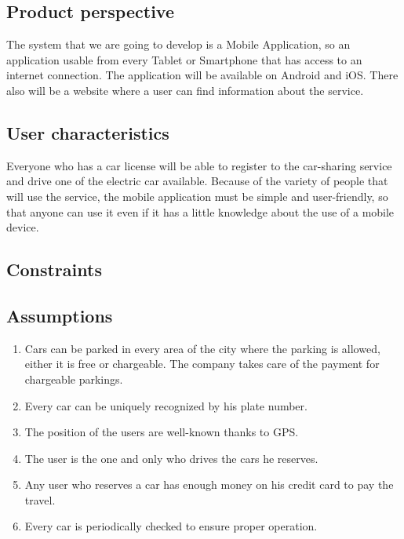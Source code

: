 \documentclass[english]{article}
\begin{document}
\subsection{Product perspective}
The system that we are going to develop is a Mobile Application, so an application usable from every Tablet or Smartphone that has access to an internet connection. The application will be available on Android and iOS. There also will be a website where a user can find information about the service.


\subsection{User characteristics}
Everyone who has a car license will be able to register to the car-sharing service and drive one of the electric car available.
Because of the variety of people that will use the service, the mobile application must be simple and user-friendly, so that anyone can use it even if it has a little knowledge about the use of a mobile device.

\subsection{Constraints}



\subsection{Assumptions}
\begin{enumerate}
	\item Cars can be parked in every area of the city where the parking is allowed, either it is free or chargeable. The company 		                    takes care of the payment for chargeable parkings. 
	\item Every car can be uniquely recognized by his plate number.
	\item The position of the users are well-known thanks to GPS.
	\item The user is the one and only who drives the cars he reserves.
	\item Any user who reserves a car has enough money on his credit card to pay the travel.
	\item Every car is periodically checked to ensure proper operation.
\end{enumerate}
\end{document}
